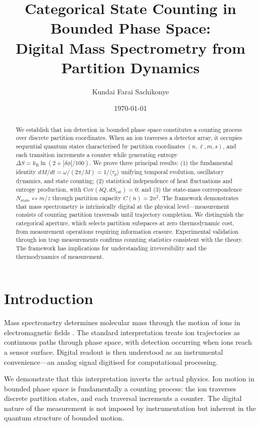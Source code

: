 \documentclass[twocolumn,10pt]{article}
\title{Categorical State Counting in Bounded Phase Space:\\Digital Mass Spectrometry from Partition Dynamics}
\author[1]{Kundai Farai Sachikonye}
\affil[1]{Technical University of Munich, TUM School of Life Sciences\\
\texttt{kundai.sachikonye@wzw.tum.de}}
\date{\today}
\newcommand{\kB}{k_{\mathrm{B}}}
\newcommand{\Nstate}{N_{\mathrm{state}}}
\begin{document}
\maketitle

\begin{abstract}
We establish that ion detection in bounded phase space constitutes a counting process over discrete partition coordinates. When an ion traverses a detector array, it occupies sequential quantum states characterised by partition coordinates $(n, \ell, m, s)$, and each transition increments a counter while generating entropy $\Delta S = \kB \ln(2 + |\delta\phi|/100)$. We prove three principal results: (1) the fundamental identity $dM/dt = \omega/(2\pi/M) = 1/\langle\tau_p\rangle$ unifying temporal evolution, oscillatory dynamics, and state counting; (2) statistical independence of heat fluctuations and entropy production, with $\text{Cov}(\delta Q, dS_{\mathrm{cat}}) = 0$; and (3) the state-mass correspondence $\Nstate \leftrightarrow m/z$ through partition capacity $C(n) = 2n^2$. The framework demonstrates that mass spectrometry is intrinsically digital at the physical level---measurement consists of counting partition traversals until trajectory completion. We distinguish the categorical aperture, which selects partition subspaces at zero thermodynamic cost, from measurement operations requiring information erasure. Experimental validation through ion trap measurements confirms counting statistics consistent with the theory. The framework has implications for understanding irreversibility and the thermodynamics of measurement.
\end{abstract}

\section{Introduction}
\label{sec:introduction}

Mass spectrometry determines molecular mass through the motion of ions in electromagnetic fields \citep{gross2017}. The standard interpretation treats ion trajectories as continuous paths through phase space, with detection occurring when ions reach a sensor surface. Digital readout is then understood as an instrumental convenience---an analog signal digitised for computational processing.

We demonstrate that this interpretation inverts the actual physics. Ion motion in bounded phase space is fundamentally a counting process: the ion traverses discrete partition states, and each traversal increments a counter. The digital nature of the measurement is not imposed by instrumentation but inherent in the quantum structure of bounded motion.
\end{document}
